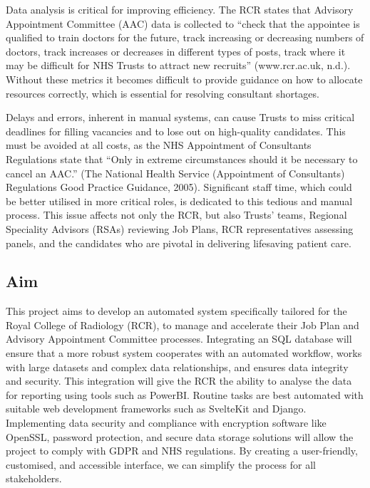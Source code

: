 \begin{multicols}{2}
Data analysis is critical for improving efficiency. The RCR states that Advisory Appointment Committee (AAC) data is collected to “check that the appointee is qualified to train doctors for the future, track increasing or decreasing numbers of doctors, track increases or decreases in different types of posts, track where it may be difficult for NHS Trusts to attract new recruits” (www.rcr.ac.uk, n.d.). Without these metrics it becomes difficult to provide guidance on how to allocate resources correctly, which is essential for resolving consultant shortages.

Delays and errors, inherent in manual systems, can cause Trusts to miss critical deadlines for filling vacancies and to lose out on high-quality candidates. This must be avoided at all costs, as the NHS Appointment of Consultants Regulations state that “Only in extreme circumstances should it be necessary to cancel an AAC.” (The National Health Service (Appointment of Consultants) Regulations Good Practice Guidance, 2005). Significant staff time, which could be better utilised in more critical roles, is dedicated to this tedious and manual process. This issue affects not only the RCR, but also Trusts’ teams, Regional Speciality Advisors (RSAs) reviewing Job Plans, RCR representatives assessing panels, and the candidates who are pivotal in delivering lifesaving patient care.
\subsection{Aim}
This project aims to develop an automated system specifically tailored for the Royal College of Radiology (RCR), to manage and accelerate their Job Plan and Advisory Appointment Committee processes. Integrating an SQL database will ensure that a more robust system cooperates with an automated workflow, works with large datasets and complex data relationships, and ensures data integrity and security. This integration will give the RCR the ability to analyse the data for reporting using tools such as PowerBI. Routine tasks are best automated with suitable web development frameworks such as SvelteKit and Django. Implementing data security and compliance with encryption software like OpenSSL, password protection, and secure data storage solutions will allow the project to comply with GDPR and NHS regulations. By creating a user-friendly, customised, and accessible interface, we can simplify the process for all stakeholders.
\end{multicols}